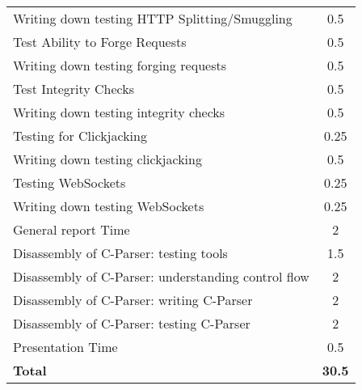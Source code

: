\begin{table}[H]
\begin{tabular*}{\textwidth}{@{\extracolsep{\fill}} l c@{\extracolsep{0pt}} }
	Writing down testing HTTP Splitting/Smuggling & 0.5 \\
	Test Ability to Forge Requests				& 0.5 \\
	Writing down testing forging requests 		& 0.5 \\
	Test Integrity Checks						& 0.5 \\
	Writing down testing integrity checks 		& 0.5 \\
	Testing for Clickjacking					& 0.25 \\
	Writing down testing clickjacking 			& 0.5 \\
	Testing WebSockets							& 0.25 \\
	Writing down testing WebSockets 			& 0.25 \\
	General report Time							& 2 \\
	Disassembly of C-Parser: testing tools		& 1.5 \\
	Disassembly of C-Parser: understanding control flow	& 2 \\
	Disassembly of C-Parser: writing C-Parser	& 2 \\
	Disassembly of C-Parser: testing C-Parser	& 2 \\
	Presentation Time 							& 0.5 \\
\hline\hline
\textbf{Total}									& \textbf{30.5}
\end{tabular*}
\end{table}
\clearpage

